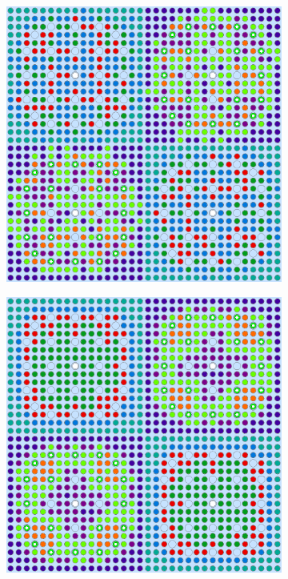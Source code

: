 \begin{appendices}
\begin{figure}[h!]
\begin{subfigure}{0.48\textwidth}
  \caption{}
  \label{fig:no-features-2x2-combined-2}
\end{subfigure}
\begin{subfigure}{0.48\textwidth}
  \centering
  \includegraphics[width=0.85\linewidth]{figures/unsupervised/geometries/without-features/4-clusters/pinch/2x2}
  \caption{}
  \label{fig:no-features-2x2-pinch-4}
\end{subfigure}%
\begin{subfigure}{0.48\textwidth}
  \centering
  \includegraphics[width=0.85\linewidth]{figures/unsupervised/geometries/without-features/4-clusters/combined/2x2}

\end{subfigure}
\end{figure}
\end{appendices}
